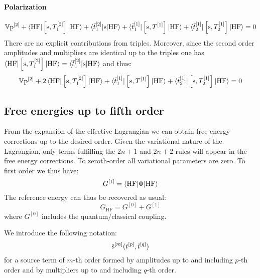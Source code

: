 \paragraph*{Polarization}
\begin{equation}
  \mathbb{V}\mathrm{p}^{[2]} +
  \braket{\mathrm{HF} | \left[ \mathrm{s}, T_1^{[2]} \right]^{}| \mathrm{HF}}
  + \braket{\bar{t}_{1}^{[2]} | \mathrm{s} | \mathrm{HF} }
  + \braket{\bar{t}_{1}^{[1]} | \left[ \mathrm{s}, T^{[1]} \right]^{} | \mathrm{HF}}
  + \braket{\bar{t}_{2}^{[1]} | \left[ \mathrm{s}, T_2^{[1]} \right]^{} | \mathrm{HF}}
  = 0
\end{equation}
There are no explicit contributions from triples.
Moreover, since the second order amplitudes and multipliers are
identical up to the triples one has $\braket{\mathrm{HF} | \left[ \mathrm{s}, T_1^{[2]} \right]^{}| \mathrm{HF}} = \braket{\bar{t}_{1}^{[2]} | \mathrm{s} | \mathrm{HF} }$
and thus:
\begin{equation}\label{eq:2nd-order-pol}
  \mathbb{V}\mathrm{p}^{[2]} +
  2\braket{\mathrm{HF} | \left[ \mathrm{s}, T_1^{[2]} \right]^{}| \mathrm{HF}}
  + \braket{\bar{t}_{1}^{[1]} | \left[ \mathrm{s}, T^{[1]} \right]^{} | \mathrm{HF}}
  + \braket{\bar{t}_{2}^{[1]} | \left[ \mathrm{s}, T_2^{[1]} \right]^{} | \mathrm{HF}}
  = 0
\end{equation}

\subsection{Free energies up to fifth order}\label{sec:energies-pt}

From the expansion of the effective Lagrangian we can obtain free energy
corrections up to the desired order. Given the variational nature of the
Lagrangian, only terms fulfilling the $2n+1$ and $2n+2$ rules will
appear in the free energy corrections.
To zeroth-order all variational parameters are zero. To first order we
thus have:
\begin{equation}\label{eq:first-order-G}
  G^{[1]} = \braket{\mathrm{HF} | \Phi | \mathrm{HF}}
\end{equation}
The reference energy can thus be recovered as usual:
\begin{equation}
  G_\mathrm{HF} = G^{[0]} + G^{[1]}
\end{equation}
where $G^{[0]}$ includes the quantum/classical coupling.

We introduce the following notation:
\begin{equation}
  \tilde{\mathrm{s}}^{[m]}(t_{}^{[p]}, \bar{t}_{}^{[q]})
\end{equation}
for a source term of $m$-th order formed by amplitudes up to and
including $p$-th order and by multipliers up to and including $q$-th order.

